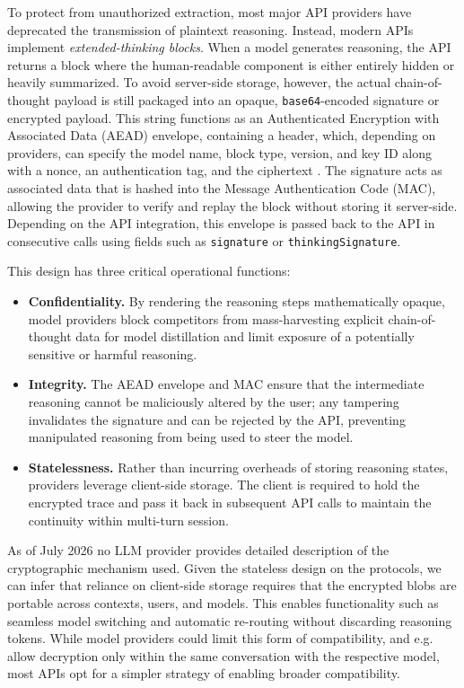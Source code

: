 To protect from unauthorized extraction, most major API providers have deprecated the transmission of plaintext reasoning. Instead, modern APIs implement \emph{extended-thinking blocks}. When a model generates reasoning, the API returns a block where the human-readable component is either entirely hidden or heavily summarized. To avoid server-side storage, however, the actual chain-of-thought payload is still packaged into an opaque, \texttt{base64}-encoded signature or encrypted payload. This string functions as an Authenticated Encryption with Associated Data (AEAD) envelope, containing a header, which, depending on providers, can specify the model name, block type, version, and key ID along with a nonce, an authentication tag, and the ciphertext \citep{green2026encryptedreasoning}. The signature acts as associated data that is hashed into the Message Authentication Code (MAC), allowing the provider to verify and replay the block without storing it server-side. Depending on the API integration, this envelope is passed back to the API in consecutive calls using fields such as \texttt{signature} or \texttt{thinkingSignature}.

This design has three critical operational functions:
\begin{itemize}
    \item \textbf{Confidentiality.} \; By rendering the reasoning steps mathematically opaque, model providers block competitors from mass-harvesting explicit chain-of-thought data for model distillation and limit exposure of a potentially sensitive or harmful reasoning.
    \item {} \textbf{Integrity.} \; The AEAD envelope and MAC ensure that the intermediate reasoning cannot be maliciously altered by the user; any tampering invalidates the signature and can be rejected by the API, preventing manipulated reasoning from being used to steer the model.
    \item \textbf{Statelessness.} \; Rather than incurring overheads of storing reasoning states, providers leverage client-side storage. The client is required to hold the encrypted trace and pass it back in subsequent API calls to maintain the continuity within multi-turn session. 
\end{itemize}
As of July 2026 no LLM provider provides detailed description of the cryptographic mechanism used. Given the stateless design on the protocols, we can infer that reliance on client-side storage requires that the encrypted blobs are portable across contexts, users, and models. This enables functionality such as seamless model switching and automatic re-routing without discarding reasoning tokens. While model providers could limit this form of compatibility, and e.g. allow decryption only within the same conversation with the respective model, most APIs opt for a simpler strategy of enabling broader compatibility.


